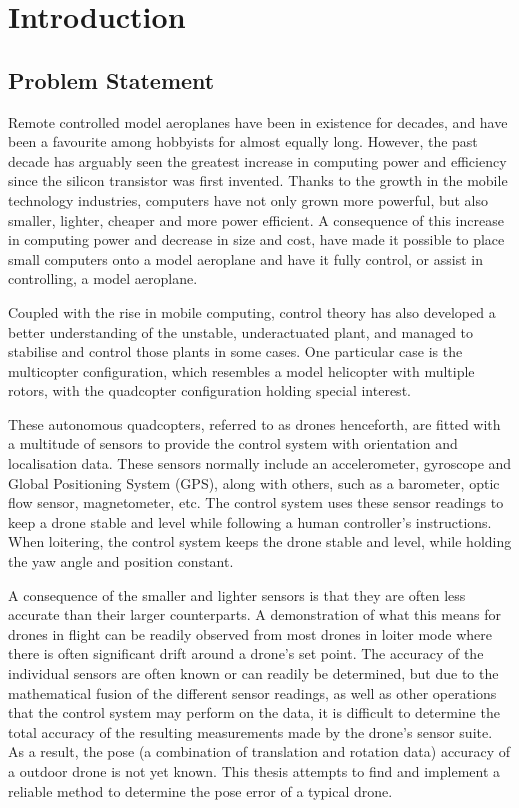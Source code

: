 \chapter{Introduction}

\section{Problem Statement}
\label{sec:problem-statement}

Remote controlled model aeroplanes have been in existence for decades, and have been a favourite among hobbyists for almost equally long. However, the past decade has arguably seen the greatest increase in computing power and efficiency since the silicon transistor was first invented. Thanks to the growth in the mobile technology industries, computers have not only grown more powerful, but also smaller, lighter, cheaper and more power efficient. A consequence of this increase in computing power and decrease in size and cost, have made it possible to place small computers onto a model aeroplane and have it fully control, or assist in controlling, a model aeroplane. 

Coupled with the rise in mobile computing, control theory has also developed a better understanding of the unstable, underactuated plant, and managed to stabilise and control those plants in some cases. One particular case is the multicopter configuration, which resembles a model helicopter with multiple rotors, with the quadcopter configuration holding special interest. 

These autonomous quadcopters, referred to as drones henceforth, are fitted with a multitude of sensors to provide the control system with orientation and localisation data. These sensors normally include an accelerometer, gyroscope and Global Positioning System (GPS), along with others, such as a barometer, optic flow sensor, magnetometer, etc. The control system uses these sensor readings to keep a drone stable and level while following a human controller's instructions. When loitering, the control system keeps the drone stable and level, while holding the yaw angle and position constant. 

A consequence of the smaller and lighter sensors is that they are often less accurate than their larger counterparts. A demonstration of what this means for drones in flight can be readily observed from most drones in loiter mode where there is often significant drift around a drone's set point. The accuracy of the individual sensors are often known or can readily be determined, but due to the mathematical fusion of the different sensor readings, as well as other operations that the control system may perform on the data, it is difficult to determine the total accuracy of the resulting measurements made by the drone's sensor suite. As a result, the pose (a combination of translation and rotation data) accuracy of a outdoor drone is not yet known. This thesis attempts to find and implement a reliable method to determine the pose error of a typical drone.  

